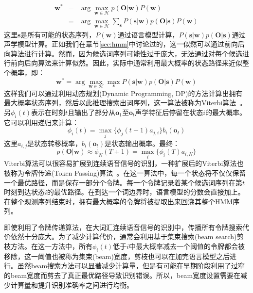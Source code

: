 \begin{eqnarray}
\mathbf{w}^* &=& \arg \max_{\mathbf{w} \in \mathcal{H}}p(\mathbf{O}|\mathbf{w})P(\mathbf{w}) \\
&=& \arg \max_{\mathbf{w} \in \mathcal{H}} \sum_{\mathbf{s}} P(\mathbf{s}|\mathbf{w})p(\mathbf{O}|\mathbf{s})P(\mathbf{w})
\end{eqnarray}
这里$\mathbf{s}$是所有可能的状态序列，$P(\mathbf{w})$通过语言模型计算，$P(\mathbf{s}|\mathbf{w})p(\mathbf{O}|\mathbf{s})$通过声学模型计算。正如我们在章节\ref{sec:hmm}中讨论过的，这一似然可以通过前向后向算法进行计算。然而，因为候选词序列可能性过于庞大，无法通过对每个候选进行前向后向算法来计算似然。因此，实际中通常利用最大概率的状态路径来近似整个概率，即：
\begin{equation}
\label{eq:decode}
\mathbf{w}^* = \arg \max_{\mathbf{w} \in \mathcal{H}} \max_{\mathbf{s}} P(\mathbf{s}|\mathbf{w})p(\mathbf{O}|\mathbf{s})P(\mathbf{w})
\end{equation}
这样我们可以通过利用动态规划(Dynamic Programming, DP)的方法计算出拥有最大概率状态序列，然后以此推理搜索出词序列，这一算法被称为Viterbi算法~\cite{viterbi1967error}。另$\phi_i(t)$表示在时刻$t$且输出了部分从$\mathbf{o}_1$至$\mathbf{o}_t$声学特征后停留在状态$i$的最大概率。它可以利用递归来计算：
\begin{equation}
\label{eq:decode-dp}
    \phi_i(t)=\max_j\{\phi_j(t-1)a_{j,i}\}b_i(\mathbf{o}_t)
\end{equation}
这里$a_{i,j}$是状态转移概率，$b_i(\mathbf{o}_t)$是状态输出概率。最终：
\begin{equation}
    p(\mathbf{O}|\mathbf{w}) \approx \phi_{N}(T+1) = \max_i\{\phi_i(T)a_{i,N}\}
\end{equation}
Viterbi算法可以很容易扩展到连续语音信号的识别，一种扩展后的Viterbi算法也被称为令牌传递(Token Passing)算法~\cite{young2002htk}。在这一算法中，每一个状态将不仅仅保留一个最优路径，而是保存一部分个令牌。每一个令牌记录着某个候选词序列在第$t$时刻到达状态$i$的最优路径。在到达一个词边界时，语言模型的分数会直接加上。在整个观测序列结束时，拥有最大概率的令牌将被提取出来回溯其整个HMM序列。

即使利用了令牌传递算法，在大词汇连续语音信号的识别中，传播所有令牌搜索代价依然十分庞大。为了减少计算代价，通常会利用基于集束搜索(beam search)剪枝方法。在这一方法中，所有$\phi_i(t)$低于$i$中最大概率减去一个阈值的令牌都会被移除，这一阈值也被称为集束(beam)宽度，剪枝也可以在加完语言模型之后进行。虽然beam搜索方法可以显著减少计算量，但是有可能在早期阶段利用了过窄的beam宽度而剪去了真正最优路径导致识别错误。所以，beam宽度设置需要在减少计算量和提升识别准确率之间进行均衡。

